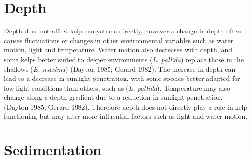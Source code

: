 \documentclass[]{article}
\begin{document}
\section{Depth}\label{depth}

Depth does not aﬀect kelp ecosystems directly, however a change in depth
often causes ﬂuctuations or changes in other environmental variables
such as water motion, light and temperature. Water motion also decreases
with depth, and some kelps better suited to deeper environments
(\emph{L. pallida}) replace those in the shallows (\emph{E. maxima})
(Dayton 1985; Gerard 1982). The increase in depth can lead to a decrease
in sunlight penetration, with some species better adapted for low-light
conditions than others, such as (\emph{L. pallida}). Temperature may
also change along a depth gradient due to a reduction in sunlight
penetration. (Dayton 1985; Gerard 1982). Therefore depth does not
directly play a role in kelp functioning but may alter more inﬂuential
factors such as light and water motion.

\section{Sedimentation}\label{sedimentation}
\end{document}
